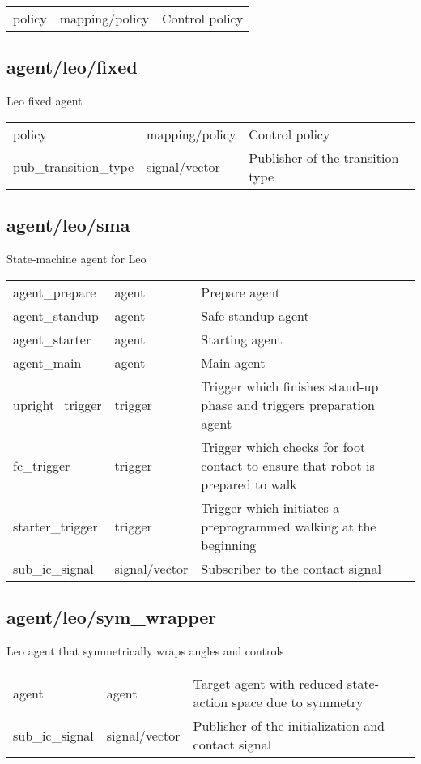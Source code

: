\noindent\begin{tabular}{@{}lll@{}}
policy&mapping/policy&Control policy\\
\end{tabular}
\subsection{agent/leo/fixed}
\noindent Leo fixed agent\\

\noindent\begin{tabular}{@{}lll@{}}
policy&mapping/policy&Control policy\\
pub\_transition\_type&signal/vector&Publisher of the transition type\\
\end{tabular}
\subsection{agent/leo/sma}
\noindent State-machine agent for Leo\\

\noindent\begin{tabular}{@{}lll@{}}
agent\_prepare&agent&Prepare agent\\
agent\_standup&agent&Safe standup agent\\
agent\_starter&agent&Starting agent\\
agent\_main&agent&Main agent\\
upright\_trigger&trigger&Trigger which finishes stand-up phase and triggers preparation agent\\
fc\_trigger&trigger&Trigger which checks for foot contact to ensure that robot is prepared to walk\\
starter\_trigger&trigger&Trigger which initiates a preprogrammed walking at the beginning\\
sub\_ic\_signal&signal/vector&Subscriber to the contact signal\\
\end{tabular}
\subsection{agent/leo/sym\_wrapper}
\noindent Leo agent that symmetrically wraps angles and controls\\

\noindent\begin{tabular}{@{}lll@{}}
agent&agent&Target agent with reduced state-action space due to symmetry\\
sub\_ic\_signal&signal/vector&Publisher of the initialization and contact signal\\
\end{tabular}
